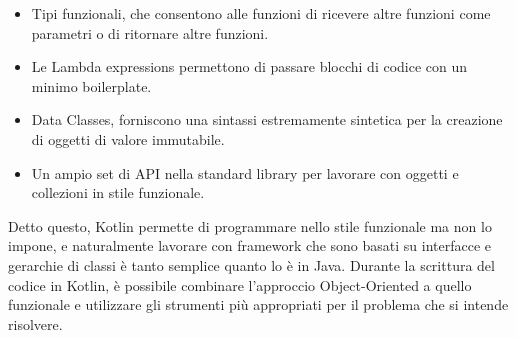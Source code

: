 \begin{itemize}
  \item Tipi funzionali, che consentono alle funzioni di ricevere altre funzioni come parametri o di ritornare altre funzioni.
  \item Le Lambda expressions permettono di passare blocchi di codice con un minimo boilerplate.
  \item Data Classes, forniscono una sintassi estremamente sintetica per la creazione di oggetti di valore immutabile.
  \item Un ampio set di API nella standard library per lavorare con oggetti e collezioni in stile funzionale.
\end{itemize}
Detto questo, Kotlin permette di programmare nello stile funzionale ma non lo impone,
e naturalmente lavorare con framework che sono basati su interfacce e gerarchie di classi
è tanto semplice quanto lo è in Java. Durante la scrittura del codice in Kotlin, è possibile
combinare l’approccio Object-Oriented a quello funzionale e utilizzare gli strumenti più appropriati
per il problema che si intende risolvere.\\

